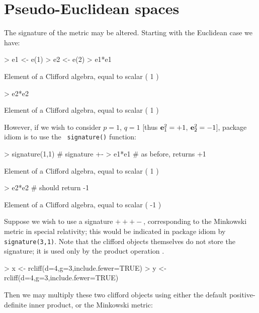 \documentclass{birkjour}
\theoremstyle{definition}
\theoremstyle{remark}
\numberwithin{equation}{section}
\begin{document}
\section{Pseudo-Euclidean spaces}

The signature of the metric may be altered.  Starting with the
Euclidean case we have:
    
\begin{Schunk}
\begin{Sinput}
> e1 <- e(1)
> e2 <- e(2)
> e1*e1
\end{Sinput}
\begin{Soutput}
Element of a Clifford algebra, equal to
scalar ( 1 )
\end{Soutput}
\begin{Sinput}
> e2*e2
\end{Sinput}
\begin{Soutput}
Element of a Clifford algebra, equal to
scalar ( 1 )
\end{Soutput}
\end{Schunk}
%
However, if we wish to consider $p=1$, $q=1$ [thus
    ${\bf e}_{1}^2=+1$, ${\bf e}_{2}^2=-1$], package idiom is to use the {\tt
    signature()} function:

\begin{Schunk}
\begin{Sinput}
> signature(1,1)  # signature +-
> e1*e1 # as before, returns +1
\end{Sinput}
\begin{Soutput}
Element of a Clifford algebra, equal to
scalar ( 1 )
\end{Soutput}
\begin{Sinput}
> e2*e2 # should return -1
\end{Sinput}
\begin{Soutput}
Element of a Clifford algebra, equal to
scalar ( -1 )
\end{Soutput}
\end{Schunk}
%
Suppose we wish to use a signature $+++-$, corresponding to the
Minkowski metric in special relativity; this would be indicated in
package idiom by {\tt signature(3,1)}.  Note that the clifford objects
themselves do not store the signature; it is used only by the product
operation {\tt *}.

\begin{Schunk}
\begin{Sinput}
> x <- rcliff(d=4,g=3,include.fewer=TRUE)
> y <- rcliff(d=4,g=3,include.fewer=TRUE)
\end{Sinput}
\end{Schunk}
%
Then we may multiply these two clifford objects using either the
default positive-definite inner product, or the Minkowski metric:
\end{document}
